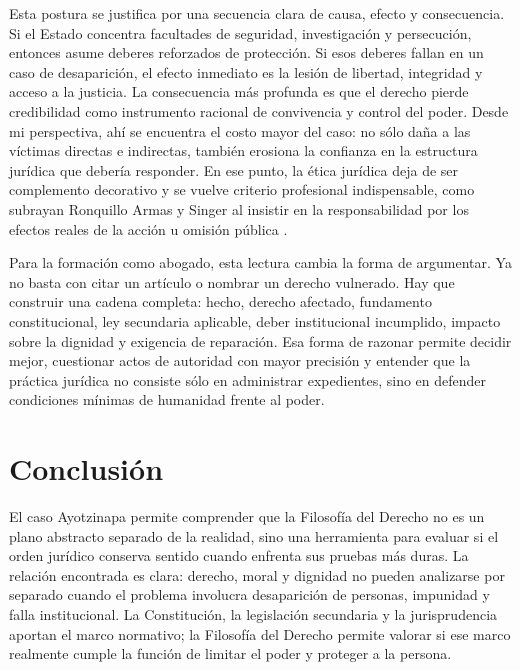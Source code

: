 \documentclass[
	spanish,
	letterpaper, oneside
]{article}
\begin{document}
Esta postura se justifica por una secuencia clara de causa, efecto y consecuencia. Si el Estado concentra facultades de seguridad, investigación y persecución, entonces asume deberes reforzados de protección. Si esos deberes fallan en un caso de desaparición, el efecto inmediato es la lesión de libertad, integridad y acceso a la justicia. La consecuencia más profunda es que el derecho pierde credibilidad como instrumento racional de convivencia y control del poder. Desde mi perspectiva, ahí se encuentra el costo mayor del caso: no sólo daña a las víctimas directas e indirectas, también erosiona la confianza en la estructura jurídica que debería responder. En ese punto, la ética jurídica deja de ser complemento decorativo y se vuelve criterio profesional indispensable, como subrayan Ronquillo Armas y Singer al insistir en la responsabilidad por los efectos reales de la acción u omisión pública \citep{ronquilloarmasEticaGeneralProfesional2018,singerCompendioEtica1995}.

Para la formación como abogado, esta lectura cambia la forma de argumentar. Ya no basta con citar un artículo o nombrar un derecho vulnerado. Hay que construir una cadena completa: hecho, derecho afectado, fundamento constitucional, ley secundaria aplicable, deber institucional incumplido, impacto sobre la dignidad y exigencia de reparación. Esa forma de razonar permite decidir mejor, cuestionar actos de autoridad con mayor precisión y entender que la práctica jurídica no consiste sólo en administrar expedientes, sino en defender condiciones mínimas de humanidad frente al poder.

%
\section{Conclusión}

El caso Ayotzinapa permite comprender que la Filosofía del Derecho no es un plano abstracto separado de la realidad, sino una herramienta para evaluar si el orden jurídico conserva sentido cuando enfrenta sus pruebas más duras. La relación encontrada es clara: derecho, moral y dignidad no pueden analizarse por separado cuando el problema involucra desaparición de personas, impunidad y falla institucional. La Constitución, la legislación secundaria y la jurisprudencia aportan el marco normativo; la Filosofía del Derecho permite valorar si ese marco realmente cumple la función de limitar el poder y proteger a la persona.
\end{document}
